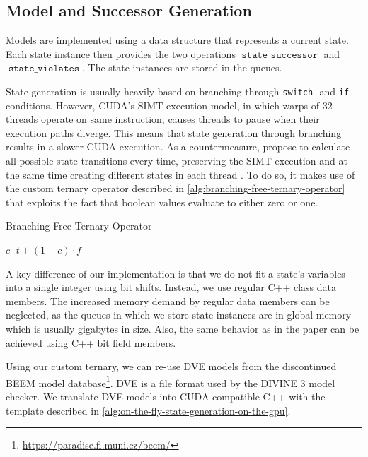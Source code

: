 \documentclass[
fancyheadings, %
%
%
]{stsreprt}
\DeclareMathOperator{\sSuccessor}{\texttt{state\_successor}}
\DeclareMathOperator{\sViolates}{\texttt{state\_violates}}
\DeclareMathOperator{\branchFreeTernary}{\texttt{BranchFreeTernary}}
\begin{document}
\subsection{Model and Successor Generation}

Models are implemented using a data structure that represents a current state.
Each state instance then provides the two operations $\sSuccessor$ and $\sViolates$.
The state instances are stored in the queues.

State generation is usually heavily based on branching through \texttt{switch}- and \texttt{if}-conditions.
However, CUDA's SIMT execution model, in which warps of 32 threads operate on same instruction, causes threads to pause when their execution paths diverge.
This means that state generation through branching results in a slower CUDA execution.
As a countermeasure, \citeauthor*{Bartocci2014.GPGPU-Parallel-SPIN} propose to calculate all possible state transitions every time, preserving the SIMT execution and at the same time creating different states in each thread \cite[Algorithm 3]{Bartocci2014.GPGPU-Parallel-SPIN}.
To do so, it makes use of the custom ternary operator described in \cref{alg:branching-free-ternary-operator} that exploits the fact that boolean values evaluate to either zero or one.

\begin{algorithm}
    \caption{Branching-Free Ternary Operator}
    \label{alg:branching-free-ternary-operator}
    \begin{algorithmic}
        \Function{$\branchFreeTernary$}{bool c, int t, int f}
        \State \Return $c \cdot t + (1 - c) \cdot f$
        \EndFunction
    \end{algorithmic}
\end{algorithm}

A key difference of our implementation is that we do not fit a state's variables into a single integer using bit shifts.
Instead, we use regular C++ class data members.
The increased memory demand by regular data members can be neglected, as the queues in which we store state instances are in global memory which is usually gigabytes in size.
Also, the same behavior as in the paper can be achieved using C++ bit field members.

Using our custom ternary, we can re-use DVE models from the discontinued BEEM model database\footnote{\url{https://paradise.fi.muni.cz/beem/}}.
DVE is a file format used by the DIVINE 3 model checker.
We translate DVE models into CUDA compatible C++ with the template described in \cref{alg:on-the-fly-state-generation-on-the-gpu}.
\end{document}
